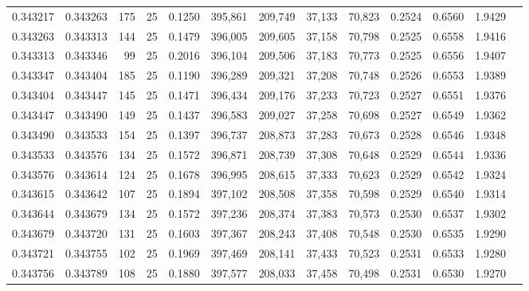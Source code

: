 \begin{tabular}{rrrrrrrrrrrrr}
0.343217 & 0.343263 &   175 &  25 &                                     0.1250 & 395,861 & 209,749 &  37,133 &  70,823 & 0.2524 & 0.6560 & 1.9429 \\
0.343263 & 0.343313 &   144 &  25 &                                     0.1479 & 396,005 & 209,605 &  37,158 &  70,798 & 0.2525 & 0.6558 & 1.9416 \\
0.343313 & 0.343346 &    99 &  25 &                                     0.2016 & 396,104 & 209,506 &  37,183 &  70,773 & 0.2525 & 0.6556 & 1.9407 \\
0.343347 & 0.343404 &   185 &  25 &                                     0.1190 & 396,289 & 209,321 &  37,208 &  70,748 & 0.2526 & 0.6553 & 1.9389 \\
0.343404 & 0.343447 &   145 &  25 &                                     0.1471 & 396,434 & 209,176 &  37,233 &  70,723 & 0.2527 & 0.6551 & 1.9376 \\
0.343447 & 0.343490 &   149 &  25 &                                     0.1437 & 396,583 & 209,027 &  37,258 &  70,698 & 0.2527 & 0.6549 & 1.9362 \\
0.343490 & 0.343533 &   154 &  25 &                                     0.1397 & 396,737 & 208,873 &  37,283 &  70,673 & 0.2528 & 0.6546 & 1.9348 \\
0.343533 & 0.343576 &   134 &  25 &                                     0.1572 & 396,871 & 208,739 &  37,308 &  70,648 & 0.2529 & 0.6544 & 1.9336 \\
0.343576 & 0.343614 &   124 &  25 &                                     0.1678 & 396,995 & 208,615 &  37,333 &  70,623 & 0.2529 & 0.6542 & 1.9324 \\
0.343615 & 0.343642 &   107 &  25 &                                     0.1894 & 397,102 & 208,508 &  37,358 &  70,598 & 0.2529 & 0.6540 & 1.9314 \\
0.343644 & 0.343679 &   134 &  25 &                                     0.1572 & 397,236 & 208,374 &  37,383 &  70,573 & 0.2530 & 0.6537 & 1.9302 \\
0.343679 & 0.343720 &   131 &  25 &                                     0.1603 & 397,367 & 208,243 &  37,408 &  70,548 & 0.2530 & 0.6535 & 1.9290 \\
0.343721 & 0.343755 &   102 &  25 &                                     0.1969 & 397,469 & 208,141 &  37,433 &  70,523 & 0.2531 & 0.6533 & 1.9280 \\
0.343756 & 0.343789 &   108 &  25 &                                     0.1880 & 397,577 & 208,033 &  37,458 &  70,498 & 0.2531 & 0.6530 & 1.9270 \\

\end{tabular}
